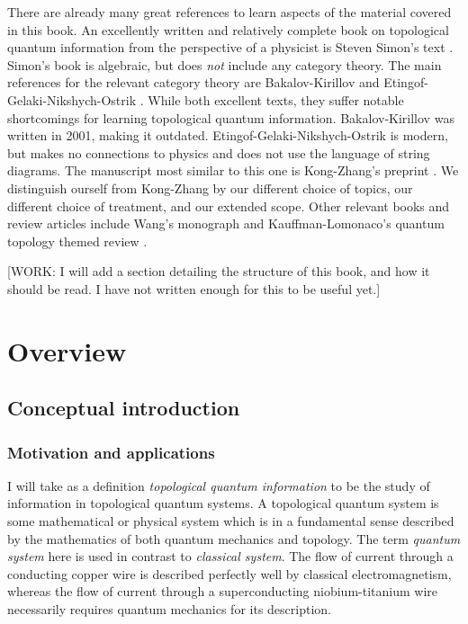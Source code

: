 \documentclass{article}
\theoremstyle{definition}
\newcommand{\0}{\left|0\right>}
\newcommand{\1}{\left|1\right>}
\numberwithin{figure}{section}
\begin{document}
There are already many great references to learn aspects of the material covered in this book. An excellently written and relatively complete book on topological quantum information from the perspective of a physicist is Steven Simon's text \cite{simon2023topological}. Simon's book is algebraic, but does \textit{not} include any category theory. The main references for the relevant category theory are Bakalov-Kirillov \cite{bakalov2001lectures} and Etingof-Gelaki-Nikshych-Ostrik \cite{etingof2016tensor}. While both excellent texts, they suffer notable shortcomings for learning topological quantum information. Bakalov-Kirillov was written in 2001, making it outdated. Etingof-Gelaki-Nikshych-Ostrik is modern, but makes no connections to physics and does not use the language of string diagrams. The manuscript most similar to this one is Kong-Zhang's preprint \cite{kong2022invitation}. We distinguish ourself from Kong-Zhang by our different choice of topics, our different choice of treatment, and our extended scope. Other relevant books and review articles include Wang's monograph \cite{wang2010topological} and Kauffman-Lomonaco's quantum topology themed review \cite{kauffman2009topological}.

[WORK: I will add a section detailing the structure of this book, and how it should be read. I have not written enough for this to be useful yet.]

\newpage

\section{Overview}
\label{overview}

\subsection{Conceptual introduction}
\label{conceptual introduction}

\subsubsection{Motivation and applications}

I will take as a definition \textit{topological quantum information} to be the study of information in topological quantum systems. A topological quantum system is some mathematical or physical system which is in a fundamental sense described by the mathematics of both quantum mechanics and topology. The term \textit{quantum system} here is used in contrast to \textit{classical system}. The flow of current through a conducting copper wire is described perfectly well by classical electromagnetism, whereas the flow of current through a superconducting niobium-titanium wire necessarily requires quantum mechanics for its description.
\end{document}
